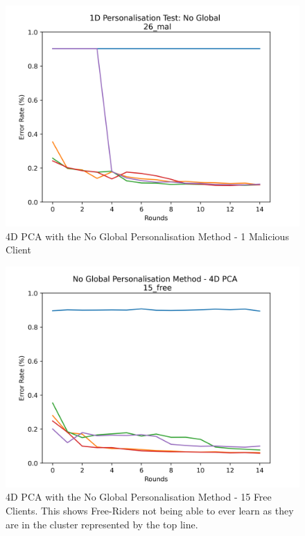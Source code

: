 \begin{figure}[htbp]
	\centering
    \includegraphics[scale=0.5]{my_agg/graphs/1d_no_global.png}
    \caption{4D PCA with the No Global Personalisation Method - 1 Malicious Client}
	\label{fig:4D_no_global_1}
\end{figure}

\begin{figure}[htbp]
	\centering
    \includegraphics[scale=0.5]{my_agg/graphs/no_global_15free.png}
    \caption{4D PCA with the No Global Personalisation Method - 15 Free Clients. This shows Free-Riders not being able to ever learn as they are in the cluster represented by the top line.}
	\label{fig:no_15free}
\end{figure}
